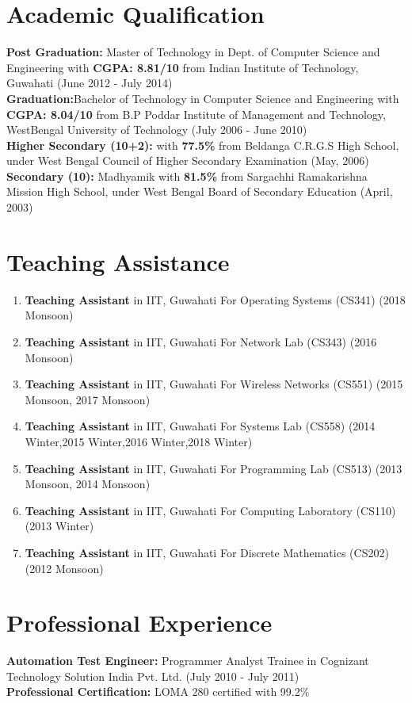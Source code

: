 \documentclass{article}
\begin{document}
\section{Academic Qualification} 
	{\bf Post Graduation:} Master of Technology in Dept. of Computer Science and Engineering with {\bf CGPA: 8.81/10} from Indian Institute of Technology, Guwahati (June 2012 - July 2014)\\[3ex]
	{\bf Graduation:}Bachelor of Technology in Computer Science and Engineering with {\bf CGPA: 8.04/10} from B.P Poddar Institute of Management and Technology, WestBengal University of Technology (July 2006 - June 2010)\\[3ex]
	{\bf Higher Secondary (10+2):} with {\bf 77.5\%} from Beldanga C.R.G.S High School, under West Bengal Council of Higher Secondary Examination (May, 2006)\\[3ex]
	{\bf Secondary (10):} Madhyamik with {\bf 81.5\%} from Sargachhi Ramakarishna Mission High School, under West Bengal Board of Secondary Education (April, 2003)
\section{Teaching Assistance}	
	\begin{enumerate}
	 \item {\bf Teaching Assistant} in IIT, Guwahati For Operating Systems (CS341) (2018 Monsoon)
	 \item {\bf Teaching Assistant} in IIT, Guwahati For Network Lab (CS343) (2016 Monsoon)
	 \item {\bf Teaching Assistant} in IIT, Guwahati For Wireless Networks (CS551) (2015 Monsoon, 2017 Monsoon)
	 \item {\bf Teaching Assistant} in IIT, Guwahati For Systems Lab (CS558) (2014 Winter,2015 Winter,2016 Winter,2018 Winter)
	 \item {\bf Teaching Assistant} in IIT, Guwahati For Programming Lab (CS513) (2013 Monsoon, 2014 Monsoon)
	 \item {\bf Teaching Assistant} in IIT, Guwahati For Computing Laboratory (CS110) (2013 Winter)
	 \item {\bf Teaching Assistant} in IIT, Guwahati For Discrete Mathematics (CS202)  (2012 Monsoon)
	\end{enumerate}
\section{Professional Experience}
	{\bf Automation Test Engineer:} Programmer Analyst Trainee in Cognizant Technology Solution India Pvt. Ltd. (July 2010 - July 2011)\\[3ex]
	{\bf Professional Certification:} LOMA 280 certified with 99.2\%         
\end{document}
